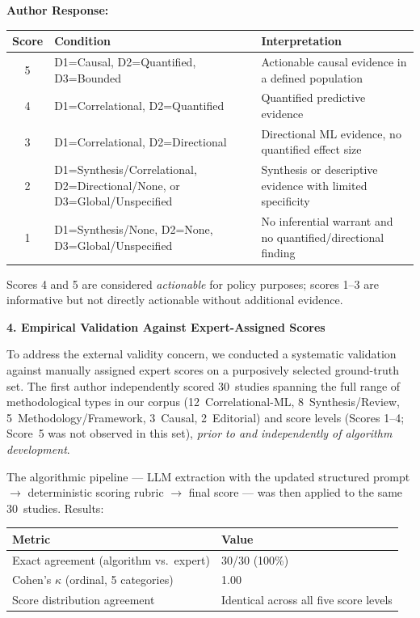\documentclass[12pt, a4paper]{article}
\newenvironment{authorresponse}{%
  \begin{mdframed}[linecolor=authorcolor, linewidth=1pt,
    backgroundcolor=authorcolor!5, innertopmargin=8pt, innerbottommargin=8pt]
  \color{authorcolor}\textbf{Author Response:}\normalcolor\par\smallskip
}{%
  \end{mdframed}\bigskip
}
\begin{document}
\begin{authorresponse}
\smallskip
\begin{tabular}{@{}clp{8cm}@{}}
\toprule
\textbf{Score} & \textbf{Condition} & \textbf{Interpretation} \\
\midrule
5 & D1=Causal, D2=Quantified, D3=Bounded &
  Actionable causal evidence in a defined population \\
4 & D1=Correlational, D2=Quantified &
  Quantified predictive evidence \\
3 & D1=Correlational, D2=Directional &
  Directional ML evidence, no quantified effect size \\
2 & D1=Synthesis/Correlational, D2=Directional/None, or
  D3=Global/Unspecified &
  Synthesis or descriptive evidence with limited specificity \\
1 & D1=Synthesis/None, D2=None, D3=Global/Unspecified &
  No inferential warrant and no quantified/directional finding \\
\bottomrule
\end{tabular}

\smallskip
Scores 4 and 5 are considered \textit{actionable} for policy purposes;
scores 1--3 are informative but not directly actionable without additional
evidence.

\medskip
\noindent\textbf{4. Empirical Validation Against Expert-Assigned Scores}

To address the external validity concern, we conducted a systematic
validation against manually assigned expert scores on a purposively
selected ground-truth set. The first author independently scored
30~studies spanning the full range of methodological types in our corpus
(12~Correlational-ML, 8~Synthesis/Review, 5~Methodology/Framework,
3~Causal, 2~Editorial) and score levels (Scores 1--4; Score~5 was not
observed in this set), \emph{prior to and independently of algorithm
development}.

The algorithmic pipeline --- LLM extraction with the updated structured
prompt $\to$ deterministic scoring rubric $\to$ final score --- was then
applied to the same 30~studies. Results:

\smallskip
\begin{tabular}{@{}ll@{}}
\toprule
\textbf{Metric} & \textbf{Value} \\
\midrule
Exact agreement (algorithm vs.\ expert) & 30/30 (100\%) \\
Cohen's $\kappa$ (ordinal, 5 categories) & 1.00 \\
Score distribution agreement & Identical across all five score levels \\
\bottomrule
\end{tabular}


\end{authorresponse}
\end{document}

